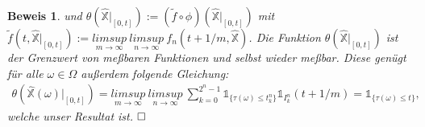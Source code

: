 \documentclass[12pt,titlepage,headsepline]{article}
\newtheorem*{beweis-non}{Beweis}
\begin{document}
\begin{beweis-non}
{        und $\theta(\hat{\mathbb{X}}\rvert_{[0,t]}) := (\tilde{f}\circ \phi)(\hat{\mathbb{X}}\rvert_{[0,t]})$ mit $\tilde{f}(t,\hat{\mathbb{X}}\rvert_{[0,t]}) := \underset{m \rightarrow \infty}{limsup} \ \underset{n \rightarrow \infty}{limsup} \ f_n(t+1/m,\hat{\mathbb{X}})$. Die Funktion $\theta(\hat{\mathbb{X}}\rvert_{[0,t]})$ ist der Grenzwert von meßbaren Funktionen und selbst wieder meßbar. Diese genügt für alle $\omega \in \Omega$ außerdem folgende Gleichung:
        \begin{align*}
          \theta(\hat{\mathbb{X}}(\omega)\rvert_{[0,t]}) = \underset{m \rightarrow \infty}{limsup} \ \underset{n \rightarrow \infty}{limsup} \ \sum_{k=0}^{2^n-1}\mathds{1}_{\{\tau(\omega)\leq t^n_k\}}\mathds{1}_{I^n_k}(t+1/m)=\mathds{1}_{\{\tau(\omega)\leq t\}},
        \end{align*}
        welche unser Resultat ist.
        }
      $\hfill\Box$
    \end{beweis-non}
\end{document}
